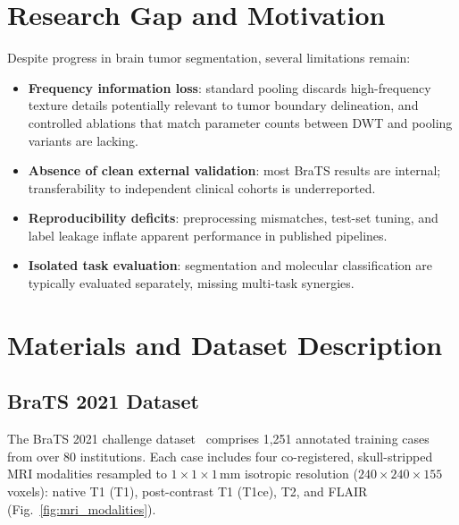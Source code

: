 \documentclass[conference]{IEEEtran}
\begin{document}
\section{Research Gap and Motivation}
\label{sec:gap}

Despite progress in brain tumor segmentation, several limitations remain:

\begin{itemize}
    \item \textbf{Frequency information loss}: standard pooling discards high-frequency texture details potentially relevant to tumor boundary delineation, and controlled ablations that match parameter counts between DWT and pooling variants are lacking.
    \item \textbf{Absence of clean external validation}: most BraTS results are internal; transferability to independent clinical cohorts is underreported.
    \item \textbf{Reproducibility deficits}: preprocessing mismatches, test-set tuning, and label leakage inflate apparent performance in published pipelines.
    \item \textbf{Isolated task evaluation}: segmentation and molecular classification are typically evaluated separately, missing multi-task synergies.
\end{itemize}

\section{Materials and Dataset Description}
\label{sec:dataset}

\subsection{BraTS 2021 Dataset}

The BraTS 2021 challenge dataset~\cite{baid2021brats} comprises 1,251 annotated training cases from over 80 institutions. Each case includes four co-registered, skull-stripped MRI modalities resampled to $1\times1\times1$\,mm isotropic resolution ($240\times240\times155$ voxels): native T1 (T1), post-contrast T1 (T1ce), T2, and FLAIR (Fig.~\ref{fig:mri_modalities}).
\end{document}
